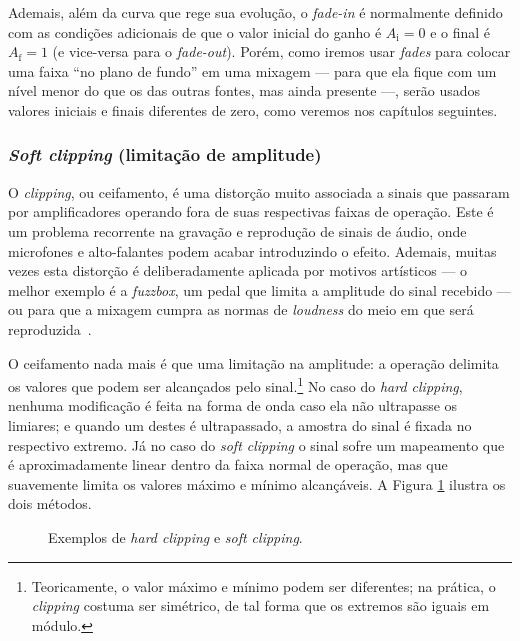 Ademais, além da curva que rege sua evolução, o \textit{fade-in} é normalmente definido
com as condições adicionais de que o valor inicial do ganho é $A_\text{i} =
	0$ e o final é $A_\text{f} =
	1$ (e vice-versa para o
\textit{fade-out}). Porém, como iremos usar \textit{fades} para colocar uma faixa ``no
plano de fundo'' em uma mixagem --- para que ela fique com um nível menor do que os das
outras fontes, mas ainda presente ---, serão usados valores iniciais e finais
diferentes de zero, como veremos nos capítulos seguintes.

\subsubsection{\textit{Soft clipping} (limitação de amplitude)}

O \textit{clipping}, ou ceifamento, é uma distorção muito associada a sinais que
passaram por amplificadores operando fora de suas respectivas faixas de operação. Este
é um problema recorrente na gravação e reprodução de sinais de áudio, onde microfones e
alto-falantes podem acabar introduzindo o efeito. Ademais, muitas vezes esta distorção
é deliberadamente aplicada por motivos artísticos --- o melhor exemplo é a
\textit{fuzzbox}, um pedal que limita a amplitude do sinal recebido --- ou para que a
mixagem cumpra as normas de \textit{loudness} do meio em que será
reproduzida~\cite{loudness-standards}.

O ceifamento nada mais é que uma limitação na amplitude: a operação delimita os valores
que podem ser alcançados pelo sinal.\footnote{Teoricamente, o valor máximo e mínimo
	podem ser diferentes; na prática, o \textit{clipping} costuma ser simétrico, de tal
	forma que os extremos são iguais em módulo.} No caso do \textit{hard clipping}, nenhuma
modificação é feita na forma de onda caso ela não ultrapasse os limiares; e quando um
destes é ultrapassado, a amostra do sinal é fixada no respectivo extremo. Já no caso do
\textit{soft clipping} o sinal sofre um mapeamento que é aproximadamente linear dentro
da faixa normal de operação, mas que suavemente limita os valores máximo e mínimo
alcançáveis. A Figura \ref{fig:intro:clipping} ilustra os dois métodos.
\begin{figure}[!ht]
	\centering
	
	\caption[Exemplos de \textit{hard clipping} e \textit{soft clipping}]{Exemplos de \textit{hard clipping} e \textit{soft clipping}.}
	\label{fig:intro:clipping}
\end{figure}

